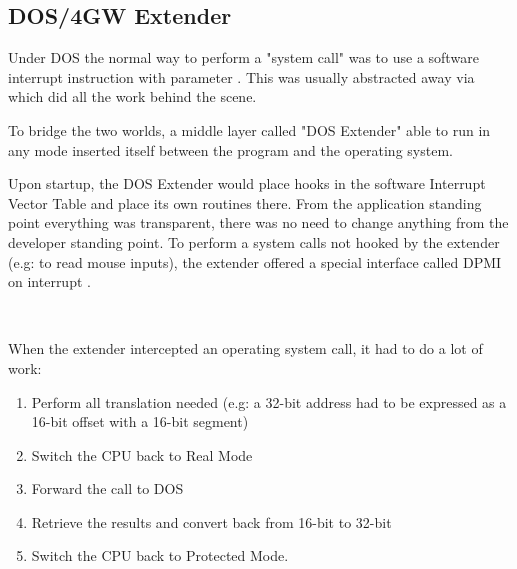 \subsection{DOS/4GW Extender}
Under DOS the normal way to perform a "system call" was to use a software interrupt instruction with parameter . This was usually abstracted away via  which did all the work behind the scene.\\
\par
{}
To bridge the two worlds, a middle layer called "DOS Extender" able to run in any mode inserted itself between the program and the operating system.\\

\par
{}
Upon startup, the DOS Extender would place hooks in the software Interrupt Vector Table and place its own routines there. From the application standing point everything was transparent, there was no need to change anything from the developer standing point. To perform a system calls not hooked by the extender (e.g:  to read mouse inputs), the extender offered a special interface called DPMI on interrupt .\\
\par
{}\\
\par
When the extender intercepted an operating system call, it had to do a lot of work:
\begin{enumerate}
\item Perform all translation needed (e.g: a 32-bit address had to be expressed as a 16-bit offset with a 16-bit segment)
\item Switch the CPU back to Real Mode
\item Forward the call to DOS
\item Retrieve the results and convert back from 16-bit to 32-bit
\item Switch the CPU back to Protected Mode.
\end{enumerate} 


